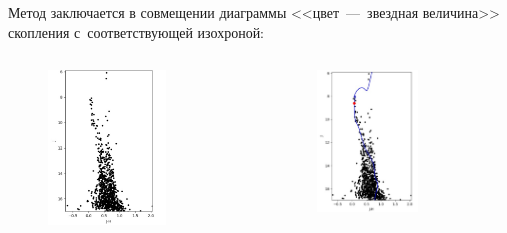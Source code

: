 \documentclass{beamer}
\begin{document}
    \begin{frame}
        Метод заключается в совмещении диаграммы <<цвет~---~звездная величина>> скопления с~соответствующей изохроной:
        \begin{columns}
            \begin{column}{0.5\textwidth}
                \begin{figure}
                    \centering
                        \includegraphics[width=0.7\textwidth]{pictures/Iso1.jpg}
                    \end{figure}
            \end{column}
            \begin{column}{0.5\textwidth}
                \begin{figure}
                \centering
                    \includegraphics[width=0.65\textwidth]{pictures/Iso2.jpg}

\end{figure}
\end{column}
\end{columns}
\end{frame}
\end{document}
